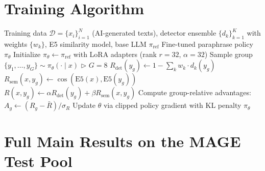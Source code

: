 \documentclass[11pt]{article}
\begin{document}
\section{Training Algorithm}
\label{app:algorithm}

\begin{algorithm}[H]
\caption{StealthRL Training}
\label{alg:stealthrl}
\begin{algorithmic}[1]
\REQUIRE Training data $\mathcal{D} = \{x_i\}_{i=1}^N$ (AI-generated texts), detector ensemble $\{d_k\}_{k=1}^K$ with weights $\{w_k\}$, E5 similarity model, base LLM $\pi_{\text{ref}}$
\ENSURE Fine-tuned paraphrase policy $\pi_\theta$
\STATE Initialize $\pi_\theta \leftarrow \pi_{\text{ref}}$ with LoRA adapters (rank $r{=}32$, $\alpha{=}32$)
      \STATE Sample group $\{y_1, \ldots, y_G\} \sim \pi_\theta(\cdot \mid x)$ \hfill $\triangleright$ $G{=}8$
        \STATE $R_{\text{det}}(y_g) \leftarrow 1 - \sum_{k} w_k \cdot d_k(y_g)$
        \STATE $R_{\text{sem}}(x, y_g) \leftarrow \cos(\text{E5}(x), \text{E5}(y_g))$
        \STATE $R(x, y_g) \leftarrow \alpha R_{\text{det}}(y_g) + \beta R_{\text{sem}}(x, y_g)$
      \ENDFOR
      \STATE Compute group-relative advantages: $A_g \leftarrow (R_g - \bar{R}) / \sigma_R$
    \ENDFOR
    \STATE Update $\theta$ via clipped policy gradient with KL penalty
  \ENDFOR
\ENDFOR
\RETURN $\pi_\theta$
\end{algorithmic}
\end{algorithm}

\FloatBarrier
\section{Full Main Results on the MAGE Test Pool}
\label{app:mainresults}

\begin{center}
\small
\setlength{\tabcolsep}{4pt}
\resizebox{\columnwidth}{!}{%
  
}
\label{tab:app_main_binoc}
\end{center}

\begin{center}
\small
\setlength{\tabcolsep}{4pt}
\resizebox{\columnwidth}{!}{%
  
}
\label{tab:app_main_fastd}
\end{center}
\end{document}

